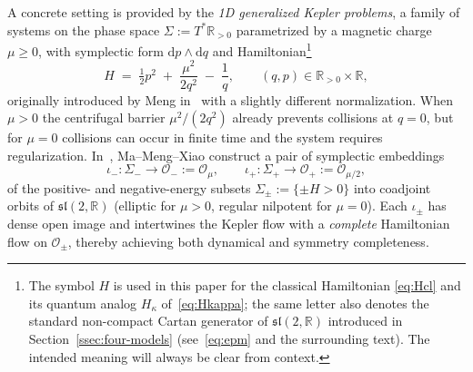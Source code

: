 \documentclass[11pt]{article}
\theoremstyle{plain}
\theoremstyle{definition}
\theoremstyle{remark}
\newcommand{\R}{\mathbb{R}}
\newcommand{\sltwo}{\mathfrak{sl}(2,\R)}
\newcommand{\OO}{\mathcal{O}}
\begin{document}
A concrete setting is provided by the \emph{1D generalized Kepler problems},
a family of systems on the phase space $\Sigma:=T^{*}\R_{>0}$ parametrized by
a magnetic charge $\mu\ge 0$, with symplectic form
$\mathrm{d}p\wedge \mathrm{d}q$ and
Hamiltonian\footnote{The symbol $H$ is used in this paper for the classical Hamiltonian
\eqref{eq:Hcl} and its quantum analog $H_{\kappa}$ of~\eqref{eq:Hkappa}; the same
letter also denotes the standard non-compact Cartan generator of $\sltwo$ introduced
in Section~\ref{ssec:four-models} (see~\eqref{eq:epm} and the surrounding text).
The intended meaning will always be clear from context.}
\begin{equation}\label{eq:Hcl}
  H \;=\; \tfrac12 p^{2}\;+\;\frac{\mu^{2}}{2q^{2}}\;-\;\frac{1}{q},
  \qquad (q,p)\in\R_{>0}\times\R,
\end{equation}
originally introduced by Meng in~\cite[Ch.~15]{Meng2024Oziewicz} with a
slightly different normalization. When $\mu>0$ the centrifugal barrier
$\mu^{2}/(2q^{2})$ already prevents collisions at $q=0$, but for $\mu=0$
collisions can occur in finite time and the system requires regularization.
In~\cite{MMX2025}, Ma--Meng--Xiao construct a pair of symplectic embeddings
\[
  \iota_{-}\colon\Sigma_{-}\longrightarrow\OO_{-}:=\OO_{\mu},\qquad
  \iota_{+}\colon\Sigma_{+}\longrightarrow\OO_{+}:=\OO_{\mu/2},
\]
of the positive- and negative-energy subsets $\Sigma_{\pm}:=\{\pm H>0\}$ into coadjoint orbits of
$\sltwo$ (elliptic for $\mu>0$, regular nilpotent for $\mu=0$). Each $\iota_{\pm}$ has dense open image and intertwines the Kepler
flow with a \emph{complete} Hamiltonian flow on $\OO_{\pm}$, thereby achieving both dynamical and symmetry completeness.
\end{document}
